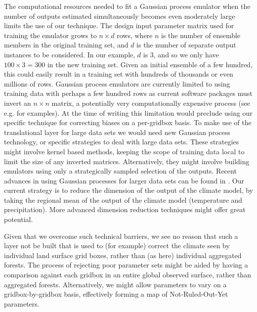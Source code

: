\documentclass[gmd, manuscript]{copernicus}
\begin{document}
The computational resources needed to fit a Gaussian process emulator when the number of outputs estimated simultaneously becomes even moderately large limits the use of our technique. The design input parameter matrix used for training the emulator grows to $n \times d$ rows, where $n$ is the number of ensemble members in the original training set, and $d$ is the number of separate output instances to be considered. In our example, $d$ is 3, and so we only have $100 \times 3 = 300$ in the new training set. Given an initial ensemble of a few hundred, this could easily result in a training set with hundreds of thousands or even millions of rows. Gaussian process emulators are currently limited to using training data with perhaps a few hundred rows as current software packages must invert an $n \times n$ matrix, a potentially very computationally expensive process (see e.g. \cite{hensman2013gaussian} for examples). At the time of writing this limitation would preclude using our specific technique for correcting biases on a per-gridbox basis. To make use of the translational layer for large data sets we would need new Gaussian process technology, or specific strategies to deal with large data sets. These strategies might involve kernel based methods, keeping the scope of training data local to limit the size of any inverted matrices. Alternatively, they might involve building emulators using only a strategically sampled selection of the outputs. Recent advances in using Gaussian processes for larger data sets can be found in \cite{hensman2013gaussian, hensman2015scalable, wilson2015thoughts,wilson2015kernel}. Our current strategy is to reduce the dimension of the output of the climate model, by taking the regional mean of the output of the climate model (temperature and precipitation). More advanced dimension reduction techniques might offer great potential.

Given that we overcome such technical barriers, we see no reason that such a layer not be built that is used to (for example) correct the climate seen by individual land surface grid boxes, rather than (as here) individual aggregated forests. The process of rejecting poor parameter sets might be aided by having a comparison against each gridbox in an entire global observed surface, rather than aggregated forests. Alternatively, we might allow parameters to vary on a gridbox-by-gridbox basis, effectively forming a map of Not-Ruled-Out-Yet parameters. 
\end{document}
